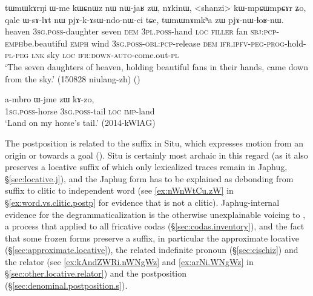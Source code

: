 \begin{exe}
\ex \label{ex:nAmkha.zW.pjAnWlhoRnW}
\gll tɯmɯkɤrŋi ɯ-me kɯɕnɯz nɯ nɯ-jaʁ zɯ, nɤkinɯ, <shanzi> kɯ-mpɕɯ\redp{}mpɕɤr ʑo, qale ɯ-sɤ-lɤt nɯ pjɤ-k-ɤsɯ-ndo-nɯ-ci tɕe,  tɯmɯnɤmkʰa zɯ pjɤ-nɯ-ɬoʁ-nɯ. \\
heaven \textsc{3sg}.\textsc{poss}-daughter seven \textsc{dem} \textsc{3pl}.\textsc{poss}-hand \textsc{loc} \textsc{filler} fan \textsc{sbj}:\textsc{pcp}-\textsc{emph}\redp{}be.beautiful \textsc{emph} wind \textsc{3sg}.\textsc{poss}-\textsc{obl}:\textsc{pcp}-release \textsc{dem} \textsc{ifr}.\textsc{ipfv}-\textsc{peg}-\textsc{prog}-hold-\textsc{pl}-\textsc{peg} \textsc{lnk} sky \textsc{loc} \textsc{ifr}:\textsc{down}-\textsc{auto}-come.out-\textsc{pl} \\
\glt `The seven daughters of heaven, holding beautiful fans in their hands, came down from the sky.' (150828 niulang-zh)
()
\end{exe}

\begin{exe}
\ex \label{ex:Wjme.zW.kAzo}
\gll   a-mbro ɯ-jme zɯ kɤ-zo, \\
\textsc{1sg}.\textsc{poss}-horse \textsc{3sg}.\textsc{poss}-tail \textsc{loc} \textsc{imp}-land \\ 
\glt `Land on my horse's tail.' (2014-kWlAG)
\end{exe}

The postposition  is related to the suffix  in Situ, which expresses motion from an origin or towards a goal (\citealt[330--331]{linxr93jiarong}). Situ is certainly most archaic in this regard (as it also preserves a locative  suffix of which only lexicalized traces remain in Japhug, §\ref{sec:locative.j}), and the Japhug form has to be explained as debonding  from suffix to clitic to independent word (see \ref{ex:nWnWtCu.zW} in §\ref{ex:word.vs.clitic.postp} for evidence that  is not a clitic). Japhug-internal evidence for the degrammaticalization is the otherwise unexplainable voicing to , a process that applied to all fricative codas (§\ref{sec:codas.inventory}), and the fact that some frozen forms preserve a  suffix, in particular the approximate locative  (§\ref{sec:approximate.locative}), the related indefinite pronoun  (§\ref{sec:cischiz}) and the relator  (see \ref{ex:kAndZWRi.nWNgWz}  and \ref{ex:arNi.WNgWz}  in §\ref{sec:other.locative.relator}) and the postposition    (§\ref{sec:denominal.postposition.s}).  


